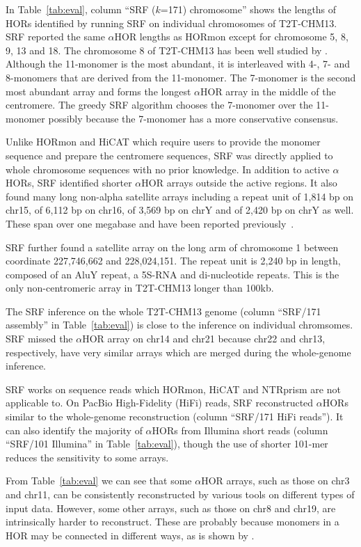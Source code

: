 \documentclass{bioinfo}
\begin{document}
In Table~\ref{tab:eval}, column ``SRF ($k$=171) chromosome'' shows the lengths
of HORs identified by running SRF on individual chromosomes of T2T-CHM13.  SRF
reported the same $\alpha$HOR lengths as HORmon except for chromosome 5, 8, 9,
13 and 18. The chromosome 8 of T2T-CHM13 has been well studied by
\citet{Logsdon:2021aa}. Although the 11-monomer is the most abundant, it is
interleaved with 4-, 7- and 8-monomers that are derived from the 11-monomer.
The 7-monomer is the second most abundant array and forms the longest
$\alpha$HOR array in the middle of the centromere. The greedy SRF algorithm
chooses the 7-monomer over the 11-monomer possibly because the 7-monomer
has a more conservative consensus.

Unlike HORmon and HiCAT which require users to provide the monomer
sequence and prepare the centromere sequences, SRF was directly applied to
whole chromosome sequences with no prior knowledge. In addition to active
$\alpha$HORs, SRF identified shorter $\alpha$HOR arrays outside the active
regions. It also found many long non-alpha satellite arrays including a repeat
unit of 1,814 bp on chr15, of 6,112 bp on chr16, of 3,569 bp on chrY and of
2,420 bp on chrY as well. These span over one megabase and have been reported
previously~\citep{Altemose:2022vw}.

SRF further found a satellite array on the long arm of chromosome 1 between
coordinate 227,746,662 and 228,024,151. The repeat unit is 2,240 bp in length,
composed of an AluY repeat, a 5S-RNA and di-nucleotide repeats. This is the
only non-centromeric array in T2T-CHM13 longer than 100kb.

The SRF inference on the whole T2T-CHM13 genome (column ``SRF/171 assembly'' in
Table~\ref{tab:eval}) is close to the inference on individual chromsomes. SRF
missed the $\alpha$HOR array on chr14 and chr21 because chr22 and chr13,
respectively, have very similar arrays which are merged during the whole-genome
inference.

SRF works on sequence reads which HORmon, HiCAT and NTRprism are not
applicable to. On PacBio High-Fidelity (HiFi) reads, SRF reconstructed
$\alpha$HORs similar to the whole-genome reconstruction (column ``SRF/171 HiFi
reads''). It can also identify the majority of $\alpha$HORs from Illumina short
reads (column ``SRF/101 Illumina'' in Table~\ref{tab:eval}), though the use of
shorter 101-mer reduces the sensitivity to some arrays.

From Table~\ref{tab:eval} we can see that some $\alpha$HOR arrays, such as
those on chr3 and chr11, can be consistently reconstructed by various tools on
different types of input data. However, some other arrays, such as those on
chr8 and chr19, are intrinsically harder to reconstruct. These are probably
because monomers in a HOR may be connected in different ways, as is shown by
\citet{Kunyavskaya:2022tx}.
\end{document}
